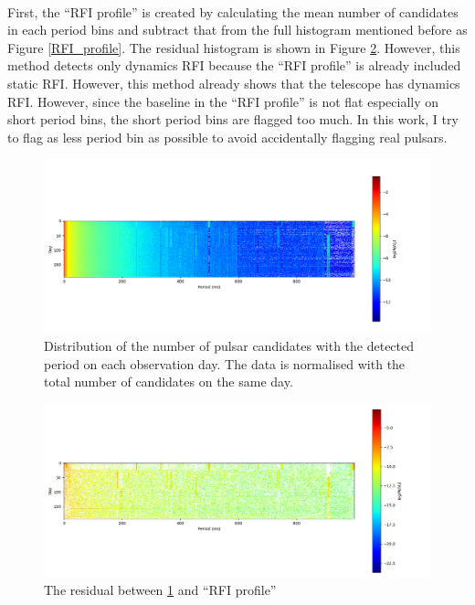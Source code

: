 \documentclass[thesis_msc.tex]{subfiles}
\begin{document}
    \paragraph{} First, the ``RFI profile'' is created by calculating the mean number of candidates in each period bins and subtract that from the full histogram mentioned before as Figure \ref{RFI_profile}. The residual histogram is shown in Figure \ref{RFI_I}. However, this method detects only dynamics RFI because the ``RFI profile'' is already included static RFI. However, this method already shows that the telescope has dynamics RFI. However, since the baseline in the  ``RFI profile'' is not flat especially on short period bins, the short period bins are flagged too much. In this work, I try to flag as less period bin as possible to avoid accidentally flagging real pulsars. 

\begin{figure}[h!] 
\centering
\includegraphics[width=1.0\textwidth]{figures/Full_log.png}
\caption{Distribution of the number of pulsar candidates with the detected period on each observation day. The data is normalised with the total number of candidates on the same day.}
\label{RFI_II}
\end{figure}

\begin{figure}[h!] 
\centering
\includegraphics[width=1.0\textwidth]{figures/RFI_mit.png}
\caption{The residual between \ref{RFI_II} and ``RFI profile'' }
\label{RFI_I}
\end{figure}
\end{document}
